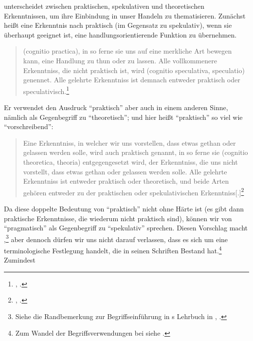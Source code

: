  unterscheidet zwischen praktischen,
spekulativen und theoretischen Erkenntnissen, um ihre Einbindung in unser
Handeln zu thematisieren. Zunächst heißt eine Erkenntnis nach  praktisch (im
Gegensatz zu spekulativ), wenn sie überhaupt geeignet ist, eine
handlungsorientierende Funktion zu übernehmen.
\begin{quote}
   (cognitio practica), in so ferne sie uns
  auf eine merkliche Art bewegen kann, eine Handlung zu thun oder zu lassen.
  Alle vollkommenere Erkenntniss, die nicht praktisch ist, wird  (cognitio speculativa, speculatio) genennet. Alle
  gelehrte Erkenntniss ist demnach entweder praktisch oder
  speculativisch.\footnote{\cite[][61]{Meier:AuszugausderVernunftlehre1752},
  \cite[][XVI: 516.20--22, 517.23--24]{Kant:GesammelteWerke1900ff.}.}
\end{quote}
Er verwendet den Ausdruck \enquote{praktisch} aber auch in einem anderen
Sinne, nämlich als Gegenbegriff zu \enquote{theoretisch}; und hier heißt
\enquote{praktisch} so viel wie \enquote{vorschreibend}:
\begin{quote}
  Eine Erkenntniss, in welcher wir uns vorstellen, dass etwas gethan oder
  gelassen werden solle, wird auch praktisch genannt, in so ferne sie  (cognitio theoretica, theoria) entgegengesetzt
  wird, der Erkenntniss, die uns nicht vorstellt, dass etwas gethan oder
  gelassen werden solle. Alle gelehrte Erkenntniss ist entweder praktisch oder
  theoretisch, und beide Arten gehören entweder zu der praktischen oder
  spekulativischen
  Erkenntniss[.]\footnote{\cite[][\pno~61\,f.]{Meier:AuszugausderVernunftlehre1752},
  \cite[][XVI: 517.25--31]{Kant:GesammelteWerke1900ff.}.}
\end{quote}
Da diese doppelte Bedeutung von \enquote{praktisch} nicht ohne Härte ist (es
gibt dann praktische Erkenntnisse, die wiederum nicht praktisch sind), können
wir von \enquote{pragmatisch} als Gegenbegriff zu \enquote{spekulativ} sprechen.
Diesen Vorschlag macht ,\footnote{Siehe die Randbemerkung
zur Begriffseinführung in s Lehrbuch in
\cite[][]{Kant:Reflexionen1900ff.}, \cite[][XVI:
516.8-9]{Kant:GesammelteWerke1900ff.}.} aber dennoch dürfen wir uns nicht darauf
verlassen, dass es sich um eine terminologische Festlegung handelt, die in
seinen Schriften Bestand hat.\footnote{Zum Wandel der Begriffsverwendungen bei
 siehe
\cite[][113--141]{Schwaiger:KategorischeundandereImperative1999}.} Zumindest
